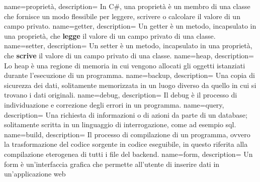 {
    name=proprietà,
    description={
        In C\#, una proprietà è un membro di una classe che fornisce un modo flessibile per leggere, scrivere o calcolare il valore di un campo privato.
        }
}
{
    name=getter,
    description={
        Un getter è un metodo, incapsulato in una proprietà, che \textbf{legge} il valore di un campo privato di una classe.
        }
}
{
    name=setter,
    description={
        Un setter è un metodo, incapsulato in una proprietà, che \textbf{scrive} il valore di un campo privato di una classe.
        }
}
{
    name=heap,
    description={
        Lo heap è una regione di memoria in cui vengono allocati gli oggetti istanziati durante l'esecuzione di un programma.
        }
}
{
    name=backup,
    description={
        Una copia di sicurezza dei dati, solitamente memorizzata in un luogo diverso da quello in cui si trovano i dati originali.
        }
}
{
    name=debug,
    description={
        Il debug è il processo di individuazione e correzione degli errori in un programma.
        }
}
{
    name=query,
    description={
        Una richiesta di informazioni o di azioni da parte di un database; solitamente scritta in un linguaggio di interrogazione, come ad esempio \acrshort{sql}.
        }
}
{
    name=build,
    description={
        Il processo di compilazione di un programma, ovvero la trasformazione del codice sorgente in codice eseguibile, in questo riferita alla compilazione eterogenea di tutti i file del backend.
        }
}
{
    name=form,
    description={
        Un form è un'interfaccia grafica che permette all'utente di inserire dati in un'applicazione web
        }
}